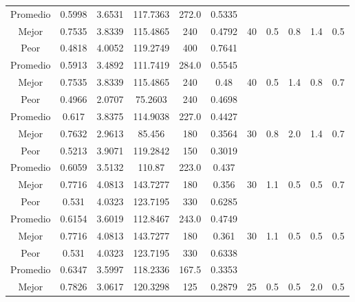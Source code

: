 \begin{table}[h!]
\begin{center}
\begin{tabular}{|c|c|c|c|c|c|c|c|c|c|c|}
        \hline
        \hline
            Promedio  & 0.5998 & 3.6531 & 117.7363 & 272.0 & 0.5335 &  &  &  &  & \\
            \cline{1-6}
            Mejor & 0.7535 & 3.8339  & 115.4865 & 240 & 0.4792 & 40 & 0.5 & 0.8 & 1.4 & 0.5\\
            \cline{1-6}
            Peor & 0.4818 & 4.0052  & 119.2749 & 400 & 0.7641 &  &  &  &  & \\
        \hline
        \hline
            Promedio  & 0.5913 & 3.4892 & 111.7419 & 284.0 & 0.5545 &  &  &  &  & \\
            \cline{1-6}
            Mejor & 0.7535 & 3.8339  & 115.4865 & 240 & 0.48 & 40 & 0.5 & 1.4 & 0.8 & 0.7\\
            \cline{1-6}
            Peor & 0.4966 & 2.0707  & 75.2603 & 240 & 0.4698 &  &  &  &  & \\
        \hline
        \hline
            Promedio  & 0.617 & 3.8375 & 114.9038 & 227.0 & 0.4427 &  &  &  &  & \\
            \cline{1-6}
            Mejor & 0.7632 & 2.9613  & 85.456 & 180 & 0.3564 & 30 & 0.8 & 2.0 & 1.4 & 0.7\\
            \cline{1-6}
            Peor & 0.5213 & 3.9071  & 119.2842 & 150 & 0.3019 &  &  &  &  & \\
        \hline
        \hline
            Promedio  & 0.6059 & 3.5132 & 110.87 & 223.0 & 0.437 &  &  &  &  & \\
            \cline{1-6}
            Mejor & 0.7716 & 4.0813  & 143.7277 & 180 & 0.356 & 30 & 1.1 & 0.5 & 0.5 & 0.7\\
            \cline{1-6}
            Peor & 0.531 & 4.0323  & 123.7195 & 330 & 0.6285 &  &  &  &  & \\
        \hline
        \hline
            Promedio  & 0.6154 & 3.6019 & 112.8467 & 243.0 & 0.4749 &  &  &  &  & \\
            \cline{1-6}
            Mejor & 0.7716 & 4.0813  & 143.7277 & 180 & 0.361 & 30 & 1.1 & 0.5 & 0.5 & 0.5\\
            \cline{1-6}
            Peor & 0.531 & 4.0323  & 123.7195 & 330 & 0.6338 &  &  &  &  & \\
        \hline
        \hline
            Promedio  & 0.6347 & 3.5997 & 118.2336 & 167.5 & 0.3353 &  &  &  &  & \\
            \cline{1-6}
            Mejor & 0.7826 & 3.0617  & 120.3298 & 125 & 0.2879 & 25 & 0.5 & 0.5 & 2.0 & 0.5\\
            \cline{1-6}

\end{tabular}
\end{center}
\end{table}
